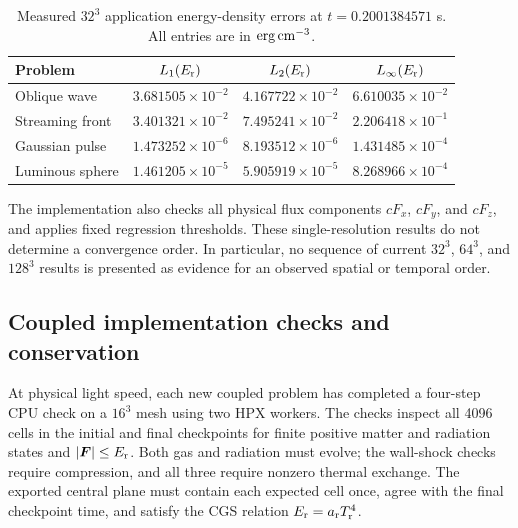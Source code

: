 \documentclass[manuscript]{aastex7}
\newcommand{\vct}[1]{\boldsymbol{#1}}
\newcommand{\Er}{E_{\rm r}}
\newcommand{\Fr}{\vct{F}}
\newcommand{\ar}{a_{\rm r}}
\begin{document}
\begin{table}[ht]
\centering
\caption{Measured $32^3$ application energy-density errors at
$t=0.2001384571$ s. All entries are in ${\rm erg\,cm^{-3}}$.
\label{tab:errors}}
\begin{tabular}{lccc}
\hline
Problem & $L_1(\Er)$ & $L_2(\Er)$ & $L_\infty(\Er)$ \\
\hline
Oblique wave & $3.681505\times10^{-2}$ & $4.167722\times10^{-2}$ & $6.610035\times10^{-2}$ \\
Streaming front & $3.401321\times10^{-2}$ & $7.495241\times10^{-2}$ & $2.206418\times10^{-1}$ \\
Gaussian pulse & $1.473252\times10^{-6}$ & $8.193512\times10^{-6}$ & $1.431485\times10^{-4}$ \\
Luminous sphere & $1.461205\times10^{-5}$ & $5.905919\times10^{-5}$ & $8.268966\times10^{-4}$ \\
\hline
\end{tabular}
\end{table}

The implementation also checks all physical flux components $cF_x$,
$cF_y$, and $cF_z$, and applies fixed regression thresholds. These
single-resolution results do not determine a convergence order. In particular, no sequence of current
$32^3$, $64^3$, and $128^3$ results is presented as evidence for an
observed spatial or temporal order.

\subsection{Coupled implementation checks and conservation}
At physical light speed, each new coupled problem has completed a four-step CPU check on a
$16^3$ mesh using two HPX workers. The checks inspect all 4096 cells in
the initial and final checkpoints for finite positive matter and
radiation states and $|\Fr|\leq\Er$. Both gas and radiation must evolve;
the wall-shock checks require compression, and all three require nonzero
thermal exchange. The exported central plane must contain each expected
cell once, agree with the final checkpoint time, and satisfy the CGS
relation $\Er=\ar T_{\rm r}^4$.
\end{document}
